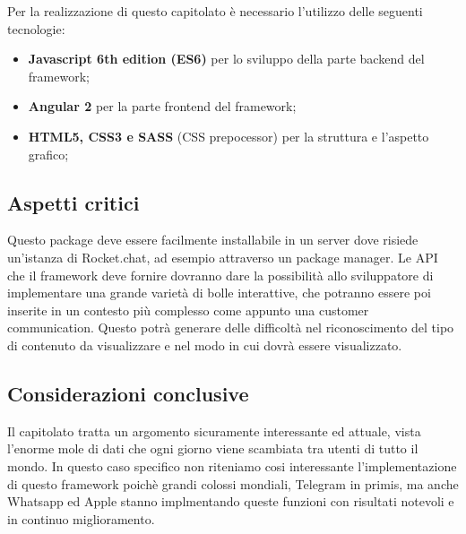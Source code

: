 Per la realizzazione di questo capitolato è necessario l'utilizzo delle seguenti tecnologie:
\begin{itemize}
	\item \textbf{Javascript 6th edition (ES6)} per lo sviluppo della parte
	backend del framework;
	\item \textbf{Angular 2 }per la parte frontend del framework;
	\item \textbf{HTML5, CSS3 e SASS} (CSS prepocessor) per la struttura e l'aspetto
	grafico;
\end{itemize}

\subsection{Aspetti critici}

Questo package deve essere facilmente installabile in un server dove
risiede un'istanza di Rocket.chat, ad esempio attraverso un package
manager. Le API che il framework deve fornire dovranno dare la possibilità
allo sviluppatore di implementare una grande varietà di bolle interattive,
che potranno essere poi inserite in un contesto più complesso come
appunto una customer communication. Questo potrà generare delle difficoltà
nel riconoscimento del tipo di contenuto da visualizzare e nel modo
in cui dovrà essere visualizzato. 

\subsection{Considerazioni conclusive}

Il capitolato tratta un argomento sicuramente interessante ed attuale,
vista l'enorme mole di dati che ogni giorno viene scambiata tra utenti
di tutto il mondo. In questo caso specifico non riteniamo cosi interessante
l'implementazione di questo framework poichè grandi colossi mondiali,
Telegram in primis, ma anche Whatsapp ed Apple stanno implmentando
queste funzioni con risultati notevoli e in continuo miglioramento.
